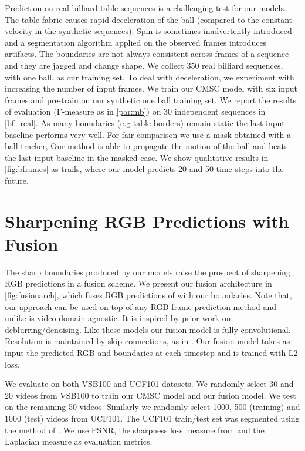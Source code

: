 Prediction on real billiard table sequences is a challenging test for our models. The table fabric causes rapid deceleration of the ball (compared to the constant velocity in the synthetic sequences). Spin is sometimes inadvertently introduced and a segmentation algorithm applied on the observed frames introduces artifacts. The boundaries are not always consistent across frames of a sequence and they are jagged and change shape.  We collect 350 real billiard sequences, with one ball, as our training set. To deal with deceleration, we experiment with increasing the number of input frames. We train our CMSC model with six input frames and pre-train on our synthetic one ball training set. We report the results of evaluation (F-measure as in \autoref{par:mb}) on 30 independent sequences in \autoref{bf_real}. As many boundaries (e.g table borders) remain static the last input baseline performs very well. For fair comparison we use a mask obtained with a ball tracker,  Our method is able to propagate the motion of the ball and beats the last input baseline in the masked case. We show qualitative results in \autoref{fig:bframes} as trails, where our model predicts 20 and 50 time-steps into the future.

\section{Sharpening RGB Predictions with Fusion}
The sharp boundaries produced by our models raise the prospect of sharpening RGB predictions in a fusion scheme. We present our fusion architecture in \autoref{fig:fusionarch}, which fuses RGB predictions of \cite{mathieu2015deep} with our boundaries. Note that, our approach can be used on top of any RGB frame prediction method and unlike \cite{villegas2017learning} is video domain agnostic. It is inspired by prior work \cite{eigen2013restoring,mao2016image} on deblurring/denoising. Like these models our fusion model is fully convolutional. Resolution is maintained by skip connections, as in \cite{mao2016image}.  Our fusion model takes as input the predicted RGB and boundaries at each timestep and is trained with L2 loss.

 We evaluate on both VSB100 and UCF101 datasets. We randomly select 30 and 20 videos from VSB100 to train our CMSC model and our fusion model. We test on the remaining 50 videos. Similarly we randomly select 1000, 500 (training) and 1000 (test) videos from UCF101. The UCF101 train/test set was segmented using the method of \cite{Man+16a}. We use PSNR, the sharpness loss measure from \cite{mathieu2015deep} and the Laplacian measure as evaluation metrics.

